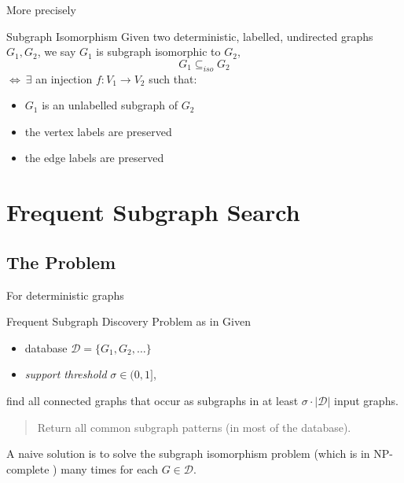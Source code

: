 \documentclass[10pt, aspectratio=149]{beamer}
\begin{document}
\begin{frame}{More precisely}
  \begin{block}{Subgraph Isomorphism \cite{sim}}
    Given two deterministic, labelled, undirected graphs $G_1, G_2$, we say $G_1$ is subgraph isomorphic to $G_2$,
    $$
    G_1 \subseteq_{iso} G_2
    $$ $\Leftrightarrow \ \exists$ an injection $f: V_1 \rightarrow V_2$ such that: 
     \begin{itemize}
         \item $G_1$ is an unlabelled subgraph of $G_2$
         
         \item the vertex labels are preserved
         
         \item  the edge labels are preserved
     \end{itemize}
  \end{block}
\end{frame}


\section[Discovering frequent subgraphs]{Frequent Subgraph Search}

\subsection{The Problem}

\begin{frame}{For deterministic graphs}

\begin{alertblock}{Frequent Subgraph Discovery Problem as in \cite{FSG}}
Given 

\begin{itemize}
    \item database $\mathcal{D} = \{G_1, G_2, \ldots \}$
    \item \textit{support threshold} $\sigma \in (0, 1]$,
\end{itemize}
 find all connected graphs that occur as subgraphs in at least $\sigma \cdot |\mathcal{D}|$ input graphs.
\end{alertblock}

\begin{quote}
    Return all common subgraph patterns (in most of the database).
\end{quote}

A naive solution is to solve the subgraph isomorphism problem (which is in NP-complete \cite{npcomp}) many times for each $G \in \mathcal{D}$.
    
\end{frame}
\end{document}
